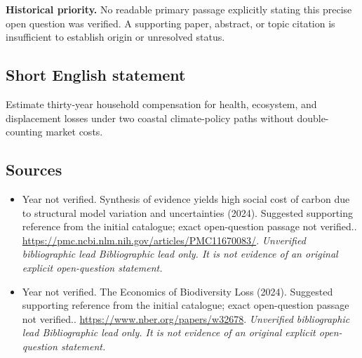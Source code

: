 \documentclass[11pt]{article}
\begin{document}
\par\textbf{Historical priority.} No readable primary passage explicitly stating this precise open question was verified. A supporting paper, abstract, or topic citation is insufficient to establish origin or unresolved status.

\subsection{Short English statement}
Estimate thirty-year household compensation for health, ecosystem, and displacement losses under two coastal climate-policy paths without double-counting market costs.

\subsection{Sources}
\begin{itemize}\raggedright
\item[\textnormal{[S1]}]\hypertarget{source:30007714:1}{} Year not verified. Synthesis of evidence yields high social cost of carbon due to structural model variation and uncertainties (2024). Suggested supporting reference from the initial catalogue; exact open-question passage not verified..
\url{https://pmc.ncbi.nlm.nih.gov/articles/PMC11670083/}.
{\small\textit{Unverified bibliographic lead Bibliographic lead only. It is not evidence of an original explicit open-question statement.}}

\item[\textnormal{[S2]}]\hypertarget{source:30007714:2}{} Year not verified. The Economics of Biodiversity Loss (2024). Suggested supporting reference from the initial catalogue; exact open-question passage not verified..
\url{https://www.nber.org/papers/w32678}.
{\small\textit{Unverified bibliographic lead Bibliographic lead only. It is not evidence of an original explicit open-question statement.}}
\end{itemize}
\end{document}
